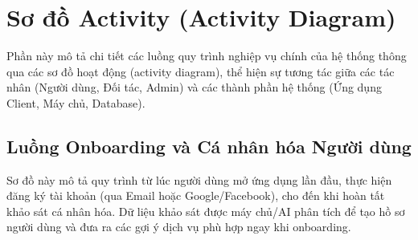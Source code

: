 













\newpage

\section{Sơ đồ Activity (Activity Diagram)}
Phần này mô tả chi tiết các luồng quy trình nghiệp vụ chính của hệ thống thông qua các sơ đồ hoạt động (activity diagram), thể hiện sự tương tác giữa các tác nhân (Người dùng, Đối tác, Admin) và các thành phần hệ thống (Ứng dụng Client, Máy chủ, Database).


\subsection{Luồng Onboarding và Cá nhân hóa Người dùng}
Sơ đồ này mô tả quy trình từ lúc người dùng mở ứng dụng lần đầu, thực hiện đăng ký tài khoản (qua Email hoặc Google/Facebook), cho đến khi hoàn tất khảo sát cá nhân hóa. Dữ liệu khảo sát được máy chủ/AI phân tích để tạo hồ sơ người dùng và đưa ra các gợi ý dịch vụ phù hợp ngay khi onboarding.

